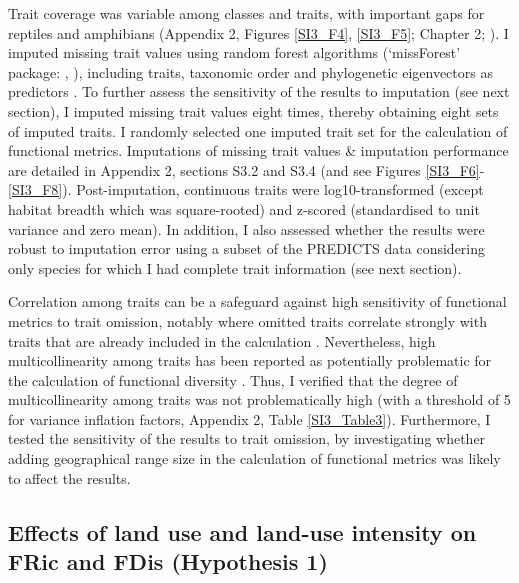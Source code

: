 Trait coverage was variable among classes and traits, with important gaps for reptiles and amphibians (Appendix 2, Figures \ref{SI3_F4}, \ref{SI3_F5}; Chapter 2; \citet{Etard2020}). I imputed missing trait values using random forest algorithms (`missForest' package: \citet{Stekhoven2012}, \citet{Stekhoven2016}), including traits, taxonomic order and phylogenetic eigenvectors as predictors \citep{Debastiani2021, Penone2014}. To further assess the sensitivity of the results to imputation (see next section), I imputed missing trait values eight times, thereby obtaining eight sets of imputed traits. I randomly selected one imputed trait set for the calculation of functional metrics. Imputations of missing trait values \& imputation performance are detailed in Appendix 2, sections S3.2 and S3.4 (and see Figures \ref{SI3_F6}-\ref{SI3_F8}). Post-imputation, continuous traits were log10-transformed (except habitat breadth which was square-rooted) and z-scored (standardised to unit variance and zero mean). In addition, I also assessed whether the results were robust to imputation error using a subset of the PREDICTS data considering only species for which I had complete trait information (see next section).

Correlation among traits can be a safeguard against high sensitivity of functional metrics to trait omission, notably where omitted traits correlate strongly with traits that are already included in the calculation \citep{Mouillot2021}. Nevertheless, high multicollinearity among traits has been reported as potentially problematic for the calculation of functional diversity \citep{Cadotte2011}. Thus, I verified that the degree of multicollinearity among traits was not problematically high (with a threshold of 5 for variance inflation factors, Appendix 2, Table \ref{SI3_Table3}). Furthermore, I tested the sensitivity of the results to trait omission, by investigating whether adding geographical range size in the calculation of functional metrics was likely to affect the results.


\subsection{Effects of land use and land-use intensity on FRic and FDis (Hypothesis 1)}

